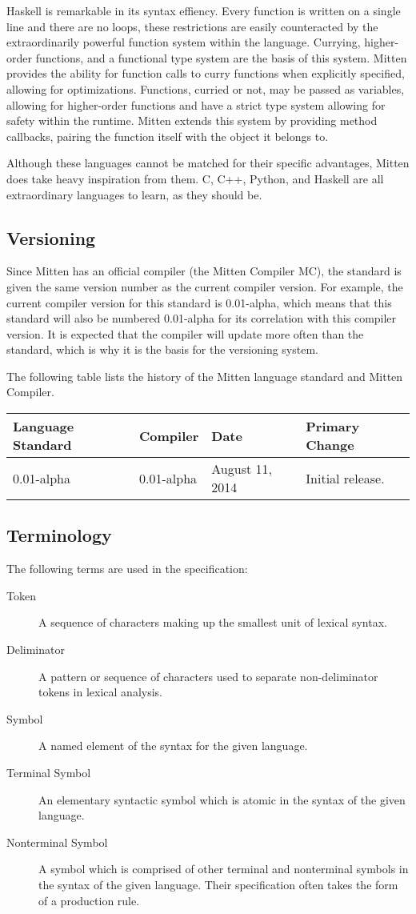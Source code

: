 \documentclass[10pt,a4paper]{article}
\begin{document}
Haskell is remarkable in its syntax effiency. Every function is written on a single line and there are no loops, these restrictions are easily counteracted by the extraordinarily powerful function system within the language. Currying, higher-order functions, and a functional type system are the basis of this system. Mitten provides the ability for function calls to curry functions when explicitly specified, allowing for optimizations. Functions, curried or not, may be passed as variables, allowing for higher-order functions and have a strict type system allowing for safety within the runtime. Mitten extends this system by providing method callbacks, pairing the function itself with the object it belongs to.

Although these languages cannot be matched for their specific advantages, Mitten does take heavy inspiration from them. C, C++, Python, and Haskell are all extraordinary languages to learn, as they should be.

\subsection{Versioning}
\label{sec:Versioning}
Since Mitten has an official compiler (the Mitten Compiler MC), the standard is given the same version number as the current compiler version. For example, the current compiler version for this standard is 0.01-alpha, which means that this standard will also be numbered 0.01-alpha for its correlation with this compiler version. It is expected that the compiler will update more often than the standard, which is why it is the basis for the versioning system.

The following table lists the history of the Mitten language standard and Mitten Compiler.
\begin{tabular}{|l|l|l|l|}
\hline
\textbf{Language Standard} & \textbf{Compiler} & \textbf{Date} & \textbf{Primary Change} \\
\hline
0.01-alpha & 0.01-alpha & August 11, 2014 & Initial release. \\
\hline
\end{tabular}

\subsection{Terminology}
The following terms are used in the specification:
\begin{description}
\item[Token] A sequence of characters making up the smallest unit of lexical syntax.
\item[Deliminator] A pattern or sequence of characters used to separate non-deliminator tokens in lexical analysis.
\item[Symbol] A named element of the syntax for the given language. 
\item[Terminal Symbol] An elementary syntactic symbol which is atomic in the syntax of the given language.
\item[Nonterminal Symbol] A symbol which is comprised of other terminal and nonterminal symbols in the syntax of the given language. Their specification often takes the form of a production rule.
\end{description}
\end{document}

